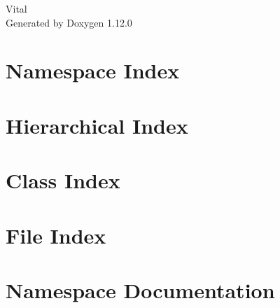 \documentclass[twoside]{book}
\newcommand{\+}{\discretionary{\mbox{\scriptsize$\hookleftarrow$}}{}{}}
\newcommand{\clearemptydoublepage}{%
    \newpage{\pagestyle{empty}\cleardoublepage}%
  }
\begin{document}
  \raggedbottom
    \hypersetup{pageanchor=false,
                bookmarksnumbered=true,
                pdfencoding=unicode
               }
  \begin{titlepage}
  \vspace*{7cm}
  \begin{center}%
  {\Large Vital}\\
  \vspace*{1cm}
  {\large Generated by Doxygen 1.12.0}\\
  \end{center}
  \end{titlepage}
  \clearemptydoublepage
  \tableofcontents
  \clearemptydoublepage
  \hypersetup{pageanchor=true}

\chapter{Namespace Index}

\chapter{Hierarchical Index}

\chapter{Class Index}

\chapter{File Index}

\chapter{Namespace Documentation}







\end{document}
